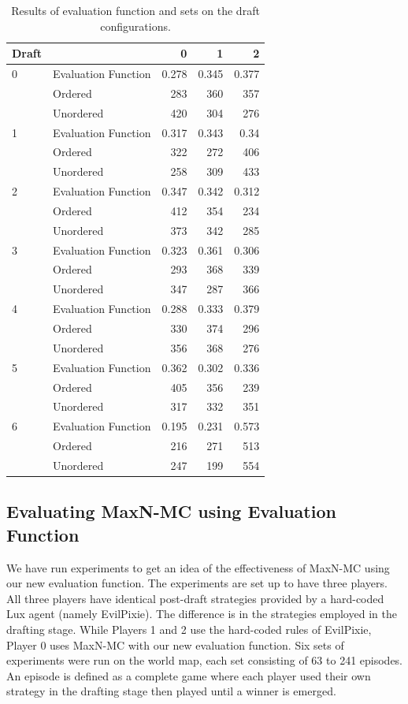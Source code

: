 \documentclass[letterpaper]{article}
\numberwithin{equation}{section}
\numberwithin{theorem}{section}
\numberwithin{lemma}{section}
\numberwithin{df}{section}
\begin{document}
\begin{table}[]
\begin{tabular}{l l r r r}  %
\hline                       %
Draft &  & 0 & 1 & 2 \\[0.5ex]%
\hline                    %
0&Evaluation Function&0.278&0.345&0.377\\&Ordered&283&360&357\\&Unordered&420&304&276\\1&Evaluation Function&0.317&0.343&0.34\\&Ordered&322&272&406\\&Unordered&258&309&433\\2&Evaluation Function&0.347&0.342&0.312\\&Ordered&412&354&234\\&Unordered&373&342&285\\3&Evaluation Function&0.323&0.361&0.306\\&Ordered&293&368&339\\&Unordered&347&287&366\\4&Evaluation Function&0.288&0.333&0.379\\&Ordered&330&374&296\\&Unordered&356&368&276\\5&Evaluation Function&0.362&0.302&0.336\\&Ordered&405&356&239\\&Unordered&317&332&351\\6&Evaluation Function&0.195&0.231&0.573\\&Ordered&216&271&513\\&Unordered&247&199&554\\
[1ex]
\hline     %
\end{tabular} 
\caption{\label{tab:results} Results of evaluation function and sets on the draft configurations.}
\end{table}


\subsection{Evaluating MaxN-MC using Evaluation Function}

We have run experiments to get an idea of the effectiveness of MaxN-MC using our new evaluation function.  The experiments are set up to have three players.  All three players have identical post-draft strategies provided by a hard-coded Lux agent (namely EvilPixie).  The difference is in the strategies employed in the drafting stage.  While Players 1 and 2 use the hard-coded rules of EvilPixie, Player 0 uses MaxN-MC with our new evaluation function.  Six sets of experiments were run on the world map, each set consisting of 63 to 241 episodes.  An episode is defined as a complete game where each player used their own strategy in the drafting stage then played until a winner is emerged.  
\end{document}
